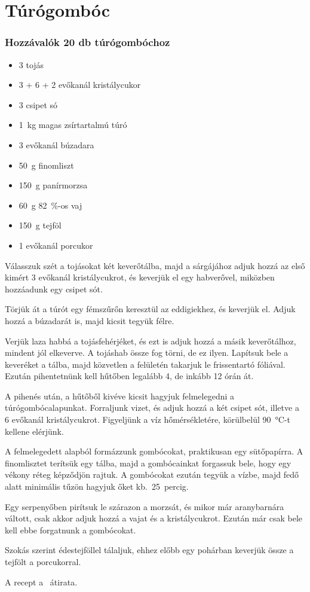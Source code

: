 \newpage
\section{Túrógombóc} \label{sec:turogomboc}

\subsubsection*{Hozzávalók 20 db túrógombóchoz}
\begin{itemize}
    \item \num{3} tojás
    \item \num{3} + \num{6} + \num{2} evőkanál kristálycukor
    \item \num{3} csipet só
    \item \qty{1}{\kg} magas zsírtartalmú túró
    \item \num{3} evőkanál búzadara
    \item \qty{50}{\g} finomliszt
    \item \qty{150}{\g} panírmorzsa
    \item \qty{60}{\g} \qty{82}{\percent}-os vaj
    \item \qty{150}{\g} tejföl
    \item \num{1} evőkanál porcukor
\end{itemize}

Válasszuk szét a tojásokat két keverőtálba, majd a sárgájához adjuk hozzá az első kimért \num{3} evőkanál kristálycukrot, és keverjük el egy habverővel, miközben hozzáadunk egy csipet sót.

Törjük át a túrót egy fémszűrőn keresztül az eddigiekhez, és keverjük el. Adjuk hozzá a búzadarát is, majd kicsit tegyük félre.

Verjük laza habbá a tojásfehérjéket, és ezt is adjuk hozzá a másik keverőtálhoz, mindent jól elkeverve. A tojáshab össze fog törni, de ez ilyen. Lapítsuk bele a keveréket a tálba, majd közvetlen a felületén takarjuk le frissentartó fóliával. Ezután pihentetnünk kell hűtőben legalább \num{4}, de inkább \num{12} órán át.

A pihenés után, a hűtőből kivéve kicsit hagyjuk felmelegedni a túrógombócalapunkat. Forraljunk vizet, és adjuk hozzá a két csipet sót, illetve a \num{6} evőkanál kristálycukrot. Figyeljünk a víz hőmérsékletére, körülbelül \qty{90}{\celsius}-t kellene elérjünk.

A felmelegedett alapból formázzunk gombócokat, praktikusan egy sütőpapírra. A finomlisztet terítsük egy tálba, majd a gombócainkat forgassuk bele, hogy egy vékony réteg képződjön rajtuk. A gombócokat ezután tegyük a vízbe, majd fedő alatt minimális tűzön hagyjuk őket kb.~\qty{25}{percig}.

Egy serpenyőben pirítsuk le szárazon a morzsát, és mikor már aranybarnára váltott, csak akkor adjuk hozzá a vajat és a kristálycukrot. Ezután már csak bele kell ebbe forgatnunk a gombócokat.

Szokás szerint édestejföllel tálaljuk, ehhez előbb egy pohárban keverjük össze a tejfölt a porcukorral.

A recept a~\cite{fomenu_turogomboc} átirata.
